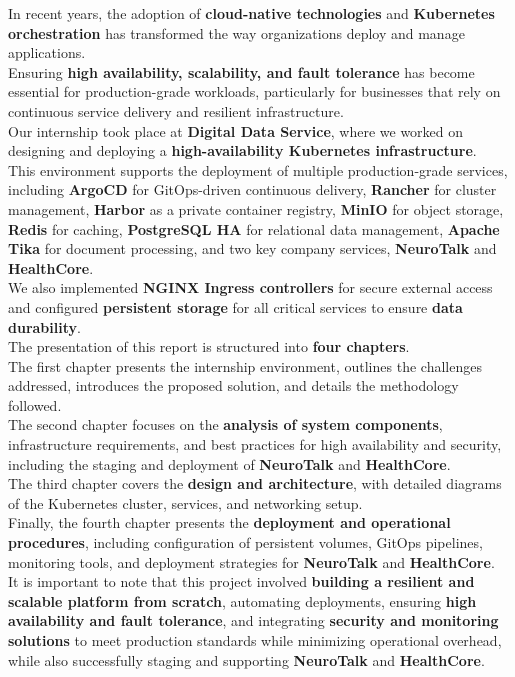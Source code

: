\documentclass[a4paper,12pt]{report}
\begin{document}
\begin{doublespace}
\vspace{1cm}
\hspace{1cm}In recent years, the adoption of \textbf{cloud-native technologies} and \textbf{Kubernetes orchestration} has transformed the way organizations deploy and manage applications.\\
Ensuring \textbf{high availability, scalability, and fault tolerance} has become essential for production-grade workloads, particularly for businesses that rely on continuous service delivery and resilient infrastructure.\\

Our internship took place at \textbf{Digital Data Service}, where we worked on designing and deploying a \textbf{high-availability Kubernetes infrastructure}.\\
This environment supports the deployment of multiple production-grade services, including \textbf{ArgoCD} for GitOps-driven continuous delivery, \textbf{Rancher} for cluster management, \textbf{Harbor} as a private container registry, \textbf{MinIO} for object storage, \textbf{Redis} for caching, \textbf{PostgreSQL HA} for relational data management, \textbf{Apache Tika} for document processing, and two key company services, \textbf{NeuroTalk} and \textbf{HealthCore}.\\
We also implemented \textbf{NGINX Ingress controllers} for secure external access and configured \textbf{persistent storage} for all critical services to ensure \textbf{data durability}.\\

The presentation of this report is structured into \textbf{four chapters}.\\
The first chapter presents the internship environment, outlines the challenges addressed, introduces the proposed solution, and details the methodology followed.\\
The second chapter focuses on the \textbf{analysis of system components}, infrastructure requirements, and best practices for high availability and security, including the staging and deployment of \textbf{NeuroTalk} and \textbf{HealthCore}.\\
The third chapter covers the \textbf{design and architecture}, with detailed diagrams of the Kubernetes cluster, services, and networking setup.\\
Finally, the fourth chapter presents the \textbf{deployment and operational procedures}, including configuration of persistent volumes, GitOps pipelines, monitoring tools, and deployment strategies for \textbf{NeuroTalk} and \textbf{HealthCore}.\\

It is important to note that this project involved \textbf{building a resilient and scalable platform from scratch}, automating deployments, ensuring \textbf{high availability and fault tolerance}, and integrating \textbf{security and monitoring solutions} to meet production standards while minimizing operational overhead, while also successfully staging and supporting \textbf{NeuroTalk} and \textbf{HealthCore}.\\
\end{doublespace}
\end{document}
